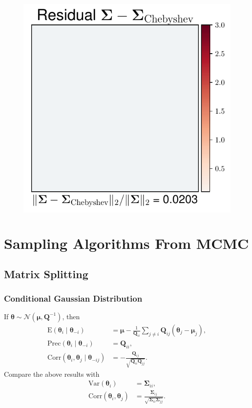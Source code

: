 \documentclass[aspectratio=169]{beamer}
\newcommand{\B}[1]{\mathbf{#1}} %
\newcommand{\Bs}[1]{\boldsymbol{#1}} %
\begin{document}
\begin{frame}
\begin{figure}
    \mbox{{\includegraphics[scale=0.3]{src/images/simu1_ex2_A_Cheby.pdf}}}
  \end{figure}
\end{frame}

\section{Sampling Algorithms From MCMC}
\subsection{Matrix Splitting}
\begin{frame}
\frametitle{Conditional Gaussian Distribution}
If $\Bs{\theta} \sim \mathcal{N}(\Bs{\mu},\B{Q}^{-1})$, then
\[
\begin{aligned}
\text{E}(\Bs{\theta}_i \mid\Bs{\theta}_{-i}) &= \Bs{\mu} - \frac{1}{\B{Q}_{ii} }\sum_{j\ne i} \B{Q}_{ij} (\Bs{\theta}_j - \Bs{\mu}_j), \\
\text{Prec}(\Bs{\theta}_i \mid\Bs{\theta}_{-i}) &= \B{Q}_{ii}, \\
\text{Corr}(\Bs{\theta}_i, \Bs{\theta}_j \mid\Bs{\theta}_{-ij}) &= -\frac{\B{Q}_{ij}}{\sqrt{\B{Q}_{ii}\B{Q}_{jj}}}.
\end{aligned}
\]
Compare the above results with
\[
\begin{aligned}
\text{Var}(\Bs{\theta}_i) &= \Bs{\Sigma}_{ii}, \\
\text{Corr}(\Bs{\theta}_i, \Bs{\theta}_j) &= \frac{\Bs{\Sigma}_{ij}}{\sqrt{\Bs{\Sigma}_{ii}\Bs{\Sigma}_{jj}}}.
\end{aligned}
\]
\end{frame}
\end{document}
